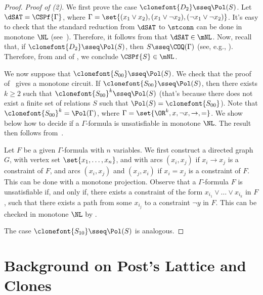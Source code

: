 \documentclass[11pt]{article}
\begin{document}
\begin{proof}
    \emph{Proof of (2)}.
    We first prove the case $\clonefont{D_2} \sseq \Pol(S)$.
    Let $\dSAT = \CSPf{\Gamma}$,
    where $\Gamma = \set{(x_1 \lor x_2), (x_1 \lor \neg x_2), (\neg x_1 \lor
    \neg x_2)}$.
    It's easy to check that the standard reduction from
    $\dSAT$ to $\stconn$ can be done in monotone $\NL$
    (see~\cite[Theorem 4]{DBLP:journals/mst/JonesLL76}).
    Therefore, it follows from 
    that
    $\dSAT \in \mNL$.
    Now, recall that, if
    $\clonefont{D_2} \sseq \Pol(S)$, then
    $S \sseq \COQ(\Gamma)$
    (see, e.g., \cite[Lemma 4.9]{DBLP:books/daglib/0004131}).
    Therefore,
    from  and
     of ,
    we conclude
    $\CSPf{S} \in \mNL$.

    We now suppose that $\clonefont{S_{00}} \sseq \Pol(S)$.
    We check that the proof of~\cite[Lemma 3.4]{DBLP:journals/jcss/AllenderBISV09}
    gives a monotone circuit.
    If $\clonefont{S_{00}} \sseq \Pol(S)$, then
    there exists $k \geq 2$ such that
    $\clonefont{S_{00}}^k \sseq \Pol(S)$
    (that's because there does not exist a finite set of relations
    $S$ such that $\Pol(S) = \clonefont{S_{00}}$).
    Note that
    $\clonefont{S_{00}}^k = \Pol(\Gamma)$,
    where $\Gamma = \set{\OR^k, x, \neg x, \to, =}$.
    We show below how to decide if a $\Gamma$-formula is unsatisfiable 
    in monotone $\NL$.
    The result then follows from~.

    Let $F$ be a given $\Gamma$-formula with $n$ variables.
    We first construct a directed graph $G$,
    with vertex set $\set{x_1,\dots,x_n}$,
    and with arcs 
    $(x_i,x_j)$
    if $x_i \to x_j$ is a constraint of $F$,
    and 
    arcs
    $(x_i,x_j)$
    and
    $(x_j,x_i)$
    if
    $x_i = x_j$ is a constraint of $F$.
    This can be done with a monotone projection.
    Observe that a $\Gamma$-formula $F$
    is unsatisfiable if, and only if,
    there exists a constraint of the form $x_{i_1} \lor \dots \lor x_{i_k}$ in $F$,
    such that there exists a path from some $x_{i_j}$ to a constraint
    $\neg y$ in $F$.
    This can be checked in monotone $\NL$ by .

    The case $\clonefont{S_{10}} \sseq \Pol(S)$ is analogous.
\end{proof}


\section{Background on Post's Lattice and Clones}
\label{sec:clone-background}
\end{document}
